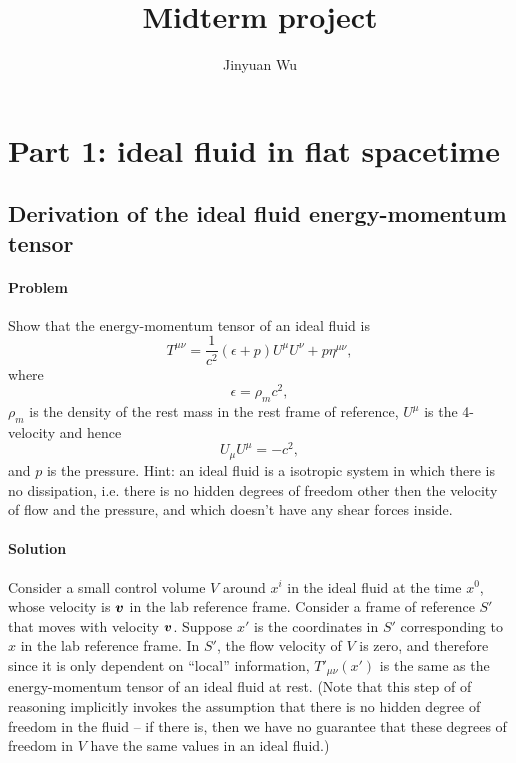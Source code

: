 \documentclass[hyperref, a4paper]{article}
\title{Midterm project}
\author{Jinyuan Wu}
\begin{document}
\maketitle

\section{Part 1: ideal fluid in flat spacetime}

\subsection{Derivation of the ideal fluid energy-momentum tensor}

\paragraph{Problem} Show that the energy-momentum tensor of an ideal fluid is 
\begin{equation}
    T^{\mu \nu} = \frac{1}{c^2} (\epsilon + p) U^\mu U^\nu + p \eta^{\mu \nu},
    \label{eq:ideal-fluid-t}
\end{equation}
where 
\begin{equation}
    \epsilon = \rho_m c^2,
\end{equation}
$\rho_m$ is the density of the rest mass in the rest frame of reference, $U^\mu$ is the 4-velocity and hence 
\begin{equation}
    U_\mu U^\mu = - c^2,
\end{equation}
and $p$ is the pressure.
Hint: an ideal fluid is a isotropic system in which there is no dissipation, i.e. there is no hidden degrees 
of freedom other then the velocity of flow and the pressure, and which doesn't have any shear forces inside.

\paragraph{Solution} Consider a small control volume $V$ around $x^i$ in the ideal fluid at the time $x^0$, whose 
velocity is $\vb*{v}$ in the lab reference frame. Consider a frame of reference $S'$ that moves with 
velocity $\vb*{v}$. Suppose $x'$ is the coordinates in $S'$ corresponding to $x$ in the lab reference frame. 
In $S'$, the flow velocity of $V$ is zero, and therefore since it is only dependent on ``local'' information, 
$T'_{\mu \nu}(x')$ is the same as the energy-momentum tensor of an ideal fluid at rest. (Note that this step 
of of reasoning implicitly invokes the assumption that there is no hidden degree of freedom in the fluid -- 
if there is, then we have no guarantee that these degrees of freedom in $V$ have the same values in an ideal 
fluid.)
\end{document}
